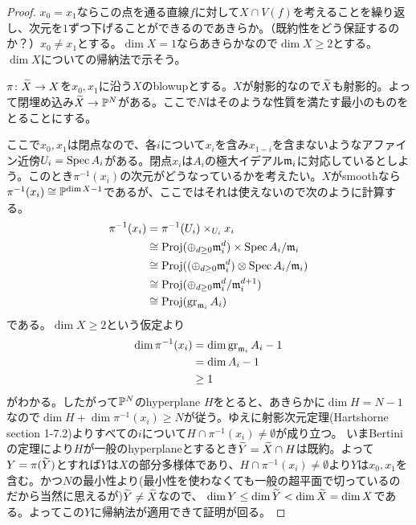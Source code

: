 \begin{proof}
  $x_0 = x_1$ならこの点を通る直線$f$に対して$X \cap V(f)$を考えることを繰り返し、次元を$1$ずつ下げることができるのであきらか。（既約性をどう保証するのか？）$x_0 \neq x_1$とする。$\dim X = 1$ならあきらかなので$\dim X \geq 2$とする。$\dim X$についての帰納法で示そう。

  $\pi \colon \wt{X} \to X$を$x_0, x_1$に沿う$X$のblowupとする。$X$が射影的なので$\wt{X}$も射影的。よって閉埋め込み$\wt{X} \to \P^N$がある。ここで$N$はそのような性質を満たす最小のものをとることにする。

  ここで$x_0, x_1$は閉点なので、各$i$について$x_i$を含み$x_{1-i}$を含まないようなアファイン近傍$U_i = \Spec A_i$がある。閉点$x_i$は$A_i$の極大イデアル$\frakm_i$に対応しているとしよう。このとき$\pi^{-1}(x_i)$の次元がどうなっているかを考えたい。$X$がsmoothなら$\pi^{-1}(x_i) \cong \P^{\dim X -1}$であるが、ここではそれは使えないので次のように計算する。
  \begin{align*}
    \pi^{-1}(x_i) &= \pi^{-1}(U_i) \tm_{U_i} x_i \\
    &\cong \Proj ( \oplus_{d \geq 0} \frakm_i^d ) \tm \Spec A_i / \frakm_i \\
    &\cong \Proj ( ( \oplus_{d \geq 0} \frakm_i^d ) \ts \Spec A_i / \frakm_i  )\\
    &\cong \Proj (  \oplus_{d \geq 0} \frakm_i^d / \frakm_i^{d+1} ) \\
    &\cong \Proj (\gr_{\frakm_i} A_i )
  \end{align*}
  である。$\dim X \geq 2$という仮定より
  \begin{align*}
    \dim \pi^{-1}(x_i) &= \dim \gr_{\frakm_i} A_i -1 \\
    &= \dim A_i - 1 \\
    &\geq 1
  \end{align*}
  がわかる。したがって$\P^N$のhyperplane $H$をとると、あきらかに$\dim H = N -1$なので$\dim H + \dim \pi^{-1}(x_i) \geq N$が従う。ゆえに射影次元定理(Hartshorne\cite{ha} section 1-7.2)よりすべての$i$について$H \cap \pi^{-1}(x_i) \neq \emptyset$が成り立つ。
  いまBertiniの定理により$H$が一般のhyperplaneとするとき$\wt{Y} = \wt{X} \cap H$は既約。よって$Y = \pi(\wt{Y})$とすれば$Y$は$X$の部分多様体であり、$H \cap \pi^{-1}(x_i) \neq \emptyset$より$Y$は$x_0,x_1$を含む。かつ$N$の最小性より(最小性を使わなくても一般の超平面で切っているのだから当然に思えるが)$\wt{Y} \neq \wt{X}$なので、
  $\dim Y \leq \dim \wt{Y} < \dim \wt{X} = \dim X$である。よってこの$Y$に帰納法が適用できて証明が回る。
\end{proof}



